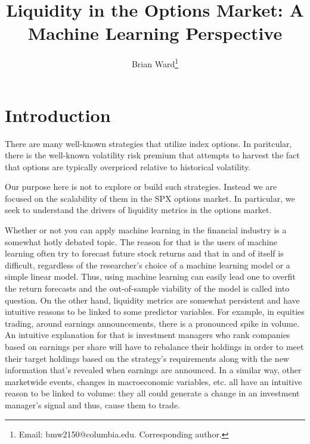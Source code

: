 \documentclass[12pt]{article}
\numberwithin{theorem}{section}
\numberwithin{equation}{section}
\numberwithin{remark}{section}
\numberwithin{definition}{section}
\numberwithin{theorem}{section}
\numberwithin{lemma}{section}
\numberwithin{example}{section}
\begin{document}
\title{Liquidity in the Options Market: A Machine Learning Perspective}
\author{Brian Ward\thanks{Email: {bmw2150@columbia.edu}. Corresponding author. }} 
\maketitle
{}

\tableofcontents

\newpage

\setcounter{section}{0}

\section{Introduction}
There are many well-known strategies that utilize index options. In paritcular, there is the well-known volatility risk premium that attempts to harvest the fact that options are typically overpriced relative to historical volatility. 

Our purpose here is not to explore or build such strategies. Instead we are focused on the scalability of them in the SPX options market. In particular, we seek to understand the drivers of liquidity metrics in the options market. 

Whether or not you can apply machine learning in the financial industry is a somewhat hotly debated topic. The reason for that is the users of machine learning often try to forecast future stock returns and that in and of itself is difficult, regardless of the researcher's choice of a machine learning model or a simple linear model. Thus, using machine learning can easily lead one to overfit the return forecasts and the out-of-sample viability of the model is called into question. On the other hand, liquidity metrics are somewhat persistent and have intuitive reasons to be linked to some predictor variables. For example, in equities trading, around earnings announcements, there is a pronounced spike in volume. An intuitive explanation for that is investment managers who rank companies based on earnings per share will have to rebalance their holdings in order to meet their target holdings based on the strategy's requirements along with the new information that's revealed when earnings are announced. In a similar way, other marketwide events, changes in macroeconomic variables, etc. all have an intuitive reason to be linked to volume: they all could generate a change in an investment manager's signal and thus, cause them to trade. 
\end{document}
